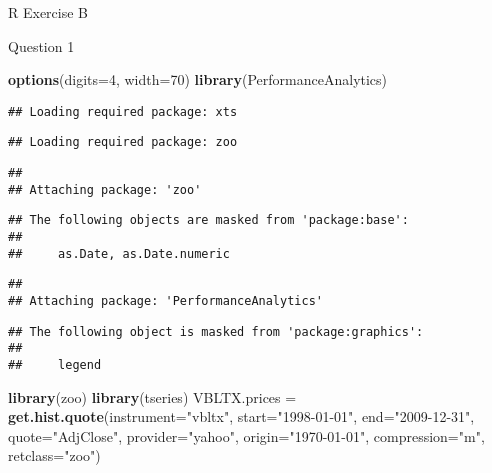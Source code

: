 \documentclass[]{article}
\newenvironment{Shaded}{\begin{snugshade}}{\end{snugshade}}
\newcommand{\KeywordTok}[1]{\textcolor[rgb]{0.13,0.29,0.53}{\textbf{#1}}}
\newcommand{\DataTypeTok}[1]{\textcolor[rgb]{0.13,0.29,0.53}{#1}}
\newcommand{\DecValTok}[1]{\textcolor[rgb]{0.00,0.00,0.81}{#1}}
\newcommand{\StringTok}[1]{\textcolor[rgb]{0.31,0.60,0.02}{#1}}
\newcommand{\NormalTok}[1]{#1}
\begin{document}
R Exercise B

Question 1

\begin{Shaded}
\begin{Highlighting}[]
\KeywordTok{options}\NormalTok{(}\DataTypeTok{digits=}\DecValTok{4}\NormalTok{, }\DataTypeTok{width=}\DecValTok{70}\NormalTok{)}
\KeywordTok{library}\NormalTok{(PerformanceAnalytics)}
\end{Highlighting}
\end{Shaded}

\begin{verbatim}
## Loading required package: xts
\end{verbatim}

\begin{verbatim}
## Loading required package: zoo
\end{verbatim}

\begin{verbatim}
## 
## Attaching package: 'zoo'
\end{verbatim}

\begin{verbatim}
## The following objects are masked from 'package:base':
## 
##     as.Date, as.Date.numeric
\end{verbatim}

\begin{verbatim}
## 
## Attaching package: 'PerformanceAnalytics'
\end{verbatim}

\begin{verbatim}
## The following object is masked from 'package:graphics':
## 
##     legend
\end{verbatim}

\begin{Shaded}
\begin{Highlighting}[]
\KeywordTok{library}\NormalTok{(zoo)}
\KeywordTok{library}\NormalTok{(tseries)}
\NormalTok{VBLTX.prices =}\StringTok{ }\KeywordTok{get.hist.quote}\NormalTok{(}\DataTypeTok{instrument=}\StringTok{"vbltx"}\NormalTok{, }\DataTypeTok{start=}\StringTok{"1998-01-01"}\NormalTok{,}
                             \DataTypeTok{end=}\StringTok{"2009-12-31"}\NormalTok{, }\DataTypeTok{quote=}\StringTok{"AdjClose"}\NormalTok{,}
                             \DataTypeTok{provider=}\StringTok{"yahoo"}\NormalTok{, }\DataTypeTok{origin=}\StringTok{"1970-01-01"}\NormalTok{,}
                             \DataTypeTok{compression=}\StringTok{"m"}\NormalTok{, }\DataTypeTok{retclass=}\StringTok{"zoo"}\NormalTok{)}
\end{Highlighting}
\end{Shaded}
\end{document}
